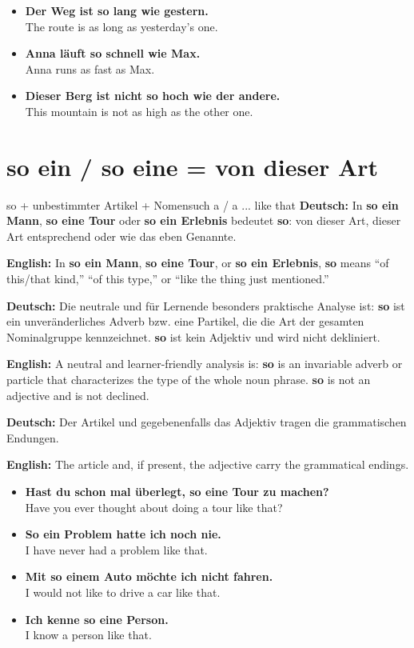 \documentclass[a4paper,11pt]{article}
\newcommand{\GermanText}[1]{\textbf{Deutsch: }#1\par}
\newcommand{\EnglishText}[1]{{\small\color{SoftGray}\textbf{English: }#1\par}}
\newcommand{\ExampleItem}[2]{\item \textbf{#1}\\{\small\color{SoftGray}#2}}
\begin{document}
        \begin{exbox}
            \begin{itemize}
                \ExampleItem{Der Weg ist so lang wie gestern.}{The route is as long as yesterday's one.}
                \ExampleItem{Anna läuft so schnell wie Max.}{Anna runs as fast as Max.}
                \ExampleItem{Dieser Berg ist nicht so hoch wie der andere.}{This mountain is not as high as the other one.}
            \end{itemize}
        \end{exbox}

    \section{\glqq so ein / so eine\grqq{} = von dieser Art}

        \begin{grammarentry}{so + unbestimmter Artikel + Nomen}{such a / a ... like that}
            \GermanText{In \textbf{so ein Mann}, \textbf{so eine Tour} oder \textbf{so ein Erlebnis} bedeutet \textbf{so}: \glqq von dieser Art\grqq, \glqq dieser Art entsprechend\grqq{} oder \glqq wie das eben Genannte\grqq.}
            \EnglishText{In \textbf{so ein Mann}, \textbf{so eine Tour}, or \textbf{so ein Erlebnis}, \textbf{so} means ``of this/that kind,'' ``of this type,'' or ``like the thing just mentioned.''}

            \GermanText{Die neutrale und für Lernende besonders praktische Analyse ist: \textbf{so} ist ein unveränderliches Adverb bzw. eine Partikel, die die Art der gesamten Nominalgruppe kennzeichnet. \textbf{so} ist kein Adjektiv und wird nicht dekliniert.}
            \EnglishText{A neutral and learner-friendly analysis is: \textbf{so} is an invariable adverb or particle that characterizes the type of the whole noun phrase. \textbf{so} is not an adjective and is not declined.}

            \GermanText{Der Artikel und gegebenenfalls das Adjektiv tragen die grammatischen Endungen.}
            \EnglishText{The article and, if present, the adjective carry the grammatical endings.}
        \end{grammarentry}

        \begin{exbox}
            \begin{itemize}
                \ExampleItem{Hast du schon mal überlegt, so eine Tour zu machen?}{Have you ever thought about doing a tour like that?}
                \ExampleItem{So ein Problem hatte ich noch nie.}{I have never had a problem like that.}
                \ExampleItem{Mit so einem Auto möchte ich nicht fahren.}{I would not like to drive a car like that.}
                \ExampleItem{Ich kenne so eine Person.}{I know a person like that.}
            \end{itemize}
        \end{exbox}
\end{document}
